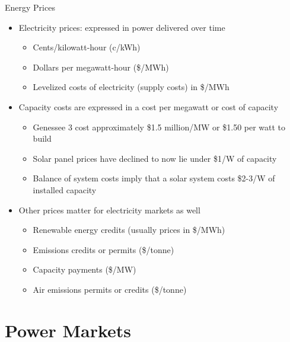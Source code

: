\documentclass{beamer}
\renewcommand{\(}{\begin{columns}}
\renewcommand{\)}{\end{columns}}
\newcommand{\<}[1]{\begin{column}{#1}}
\renewcommand{\>}{\end{column}}
\begin{document}
\begin{frame}{Energy Prices}
\begin{itemize}
\setlength\itemsep{.25em}
\item Electricity prices: expressed in power delivered over time
\begin{itemize}
\setlength\itemsep{.15em}
\item Cents/kilowatt-hour (c/kWh)
\item Dollars per megawatt-hour (\$/MWh)
\item Levelized costs of electricity (supply costs) in \$/MWh
\end{itemize}

\item Capacity costs are expressed in a cost per megawatt or cost of capacity
\begin{itemize}
\setlength\itemsep{.15em}
\item Genessee 3 cost approximately \$1.5 million/MW or \$1.50 per watt to build
\item Solar panel prices have declined to now lie under \$1/W of capacity
\item Balance of system costs imply that a solar system costs \$2-3/W of installed capacity
\end{itemize}
\item Other prices matter for electricity markets as well
\begin{itemize}
\setlength\itemsep{.15em}
\item Renewable energy credits (usually prices in \$/MWh)
\item Emissions credits or permits (\$/tonne)
\item Capacity payments (\$/MW)
\item Air emissions permits or credits (\$/tonne)
\end{itemize}
\end{itemize}

\vfill \end{frame}

\section{Power Markets}
\end{document}
